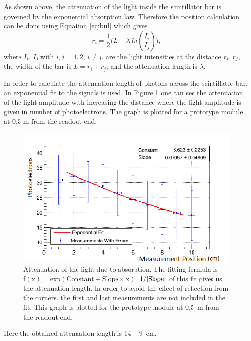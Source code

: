 \documentclass[a4paper]{article}\linespread{1.4}
\begin{document}
As shown above, the attenuation of the light inside the scintillator bar is governed by the exponential absorption law.
Therefore the position calculation can be done using Equation \ref{eq:bul} which gives
\begin{equation} \label{eq:pos} r_{i}=\frac{1}{2} \Big(L - \lambda~ln(\frac{I_{i}}{I_{j}})\Big), \end{equation}
where $I_{i}$, $I_{j}$ with $i, j=1,2$, $i\neq j$, are the light intensities at the distance $r_{i}$, $r_{j}$, the width of the bar is $L=r_{i}+r_{j}$, and the attenuation length is $\lambda$. 

In order to calculate the attenuation length of photons across the scintillator bar, an exponential fit to the signals is used. In Figure \ref{fig:mamafi} one can see the attenuation of the light amplitude with increasing the distance where the light amplitude is given in number of photoelectrons. %
The graph is plotted for a prototype module at 0.5 m from the readout end.
\begin{figure}[h!] \hspace*{-0.7cm}  \includegraphics[width=130mm,scale=1.0]{un.png} \caption{Attenuation of the light due to absorption. The fitting formula is $\mathrm{f(x) = exp(Constant + Slope\times x)}$. $\mathrm{1/ \abs{Slope}}$ of this fit gives us the attenuation length. In order to avoid the effect of reflection from the corners, the first and last measurements are not included in the fit. This graph is plotted for the prototype module at 0.5~m from the readout end.} \label{fig:mamafi}\end{figure}  
Here the obtained attenuation length is $14 \pm 9$~cm. %
\end{document}
